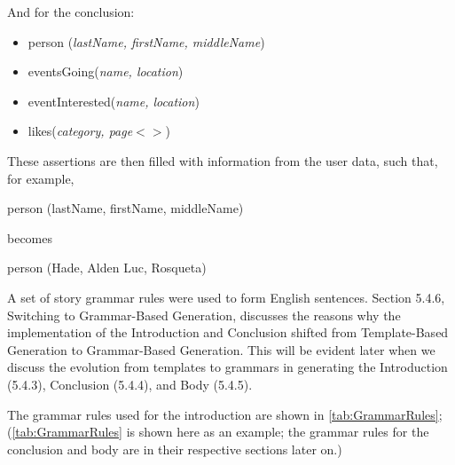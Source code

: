And for the conclusion:
\begin{itemize}
	\item person (\textit{lastName, firstName, middleName})
	\item eventsGoing(\textit{name, location})
	\item eventInterested(\textit{name, location})
	\item likes(\textit{category, page$<$$>$})
\end{itemize}
These assertions are then filled with information from the user data, such that, for example,

\begin{center} person (lastName, firstName, middleName) \end{center}

becomes

\begin{center} person (Hade, Alden Luc, Rosqueta) \end{center}

A set of story grammar rules were used to form English sentences. Section 5.4.6, Switching to Grammar-Based Generation, discusses the reasons why the implementation of the Introduction and Conclusion shifted from Template-Based Generation to Grammar-Based Generation. This will be evident later when we discuss the evolution from templates to grammars in generating the Introduction (5.4.3), Conclusion (5.4.4), and Body (5.4.5).

The grammar rules used for the introduction are shown in \ref{tab:GrammarRules}; (\ref{tab:GrammarRules} is shown here as an example; the grammar rules for the conclusion and body are in their respective sections later on.)


